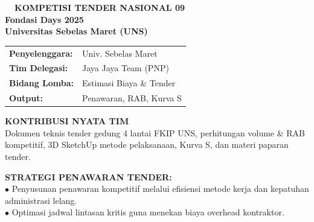\documentclass[10pt,a4paper,landscape]{article}
\begin{document}
\noindent
\begin{minipage}[t]{0.30\linewidth}
  \vspace{0pt}
  \begin{tcolorbox}[sharp corners, boxrule=0.8pt, colframe=pborder, colback=white, left=3mm, right=3mm, top=2.5mm, bottom=2.5mm, height=100mm]
    \colorbox{pred}{\fontsize{7pt}{8pt}\selectfont\bfseries\color{white}\ \ KOMPETISI TENDER NASIONAL 09\ \ }\\[1.5mm]
    {\fontsize{9.5pt}{11.5pt}\selectfont\bfseries\color{pnavy}Fondasi Days 2025}\\[0.5mm]
    {\fontsize{7pt}{8.5pt}\selectfont\bfseries\color{pred}Universitas Sebelas Maret (UNS)}\\[2mm]

    \begin{tcolorbox}[sharp corners, boxrule=0.5pt, colframe=pborder, colback=pbglight, left=2mm, right=2mm, top=1.5mm, bottom=1.5mm]
      \begin{tabularx}{\linewidth}{@{}p{22mm} X@{}}
        {\fontsize{6.8pt}{8pt}\selectfont\bfseries Penyelenggara:} & {\fontsize{6.8pt}{8pt}\selectfont Univ. Sebelas Maret} \\[0.8mm]
        {\fontsize{6.8pt}{8pt}\selectfont\bfseries Tim Delegasi:} & {\fontsize{6.8pt}{8pt}\selectfont Jaya Jaya Team (PNP)} \\[0.8mm]
        {\fontsize{6.8pt}{8pt}\selectfont\bfseries Bidang Lomba:} & {\fontsize{6.8pt}{8pt}\selectfont Estimasi Biaya \& Tender} \\[0.8mm]
        {\fontsize{6.8pt}{8pt}\selectfont\bfseries Output:} & {\fontsize{6.8pt}{8pt}\selectfont Penawaran, RAB, Kurva S}
      \end{tabularx}
    \end{tcolorbox}
    \vspace{1.5mm}

    {\fontsize{7.5pt}{9pt}\selectfont\bfseries\color{pnavy}KONTRIBUSI NYATA TIM}\\[0.8mm]
    {\fontsize{6.5pt}{8.2pt}\selectfont\color{psteel}
    Dokumen teknis tender gedung 4 lantai FKIP UNS, perhitungan volume \& RAB kompetitif, 3D SketchUp metode pelaksanaan, Kurva S, dan materi paparan tender.
    }
  \end{tcolorbox}
  \vspace{2mm}

  \begin{tcolorbox}[sharp corners, boxrule=0.6pt, colframe=pnavy, colback=pbglight, left=2.5mm, right=2.5mm, top=2mm, bottom=2mm, height=52mm]
    {\fontsize{7pt}{8.5pt}\selectfont\bfseries\color{pnavy}STRATEGI PENAWARAN TENDER:}\\[1.5mm]
    {\fontsize{6.5pt}{8.2pt}\selectfont\color{psteel}
    $\bullet$ Penyusunan penawaran kompetitif melalui efisiensi metode kerja dan kepatuhan administrasi lelang.\\
    $\bullet$ Optimasi jadwal lintasan kritis guna menekan biaya overhead kontraktor.
    }
  \end{tcolorbox}
\end{minipage}%
\end{document}
